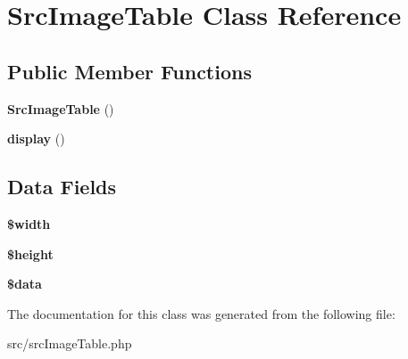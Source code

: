 \hypertarget{class_src_image_table}{
\section{\-Src\-Image\-Table \-Class \-Reference}
\label{class_src_image_table}
}
\subsection*{\-Public \-Member \-Functions}
\begin{DoxyCompactItemize}
\item 
\hypertarget{class_src_image_table_a539d21e8bb22356b12e77d555e4958fc}{
{\bfseries \-Src\-Image\-Table} ()}
\label{class_src_image_table_a539d21e8bb22356b12e77d555e4958fc}

\item 
\hypertarget{class_src_image_table_a0b9b6e6acd4a839fc7c2f26f96b5cfa8}{
{\bfseries display} ()}
\label{class_src_image_table_a0b9b6e6acd4a839fc7c2f26f96b5cfa8}

\end{DoxyCompactItemize}
\subsection*{\-Data \-Fields}
\begin{DoxyCompactItemize}
\item 
\hypertarget{class_src_image_table_a5795120b4b324bc4ca83f1e6fdce7d57}{
{\bfseries \$width}}
\label{class_src_image_table_a5795120b4b324bc4ca83f1e6fdce7d57}

\item 
\hypertarget{class_src_image_table_a2c265bba1724371bb03e6901297c30b2}{
{\bfseries \$height}}
\label{class_src_image_table_a2c265bba1724371bb03e6901297c30b2}

\item 
\hypertarget{class_src_image_table_a6efc15b5a2314dd4b5aaa556a375c6d6}{
{\bfseries \$data}}
\label{class_src_image_table_a6efc15b5a2314dd4b5aaa556a375c6d6}

\end{DoxyCompactItemize}


\-The documentation for this class was generated from the following file\-:\begin{DoxyCompactItemize}
\item 
src/src\-Image\-Table.\-php\end{DoxyCompactItemize}
